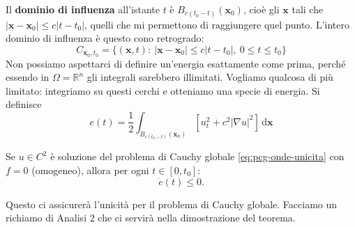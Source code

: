 \documentclass[10pt,a4paper,twoside,openright]{book}
\newcommand{\x}{\mathbf{x}}
\newcommand{\de}{\,\mathrm d}
\newcommand{\dxx}{\de \x}
\begin{document}
Il \textbf{dominio di influenza} all'istante $t$ è $B_{c(t_{0} -t)}(\x_{0})$, cioè gli $\x$ tali che $| \x -\x_{0}| \leqslant c| t-t_{0}| $, quelli che mi permettono di raggiungere quel punto. L'intero dominio di influenza è questo cono retrogrado:
\begin{equation}
    C_{\x_{0} ,t_{0}} =\{(\x ,t) :\ | \x -\x_{0}| \leqslant c| t-t_{0}| ,\ 0\leqslant t\leqslant t_{0}\}
\end{equation}
Non possiamo aspettarci di definire un'energia esattamente come prima, perché essendo in $\Omega =\mathbb{R}^{n}$ gli integrali sarebbero illimitati. Vogliamo qualcosa di più limitato: integriamo su questi cerchi e otteniamo una specie di energia. Si definisce
\begin{equation}
    e(t) =\frac{1}{2}\int _{B_{c(t_{0} -t)}(\x_{0})}\left[ u_{t}^{2} +c^{2}| \nabla u| ^{2}\right] \dxx
    \label{eq:onde-energia-pcg}
\end{equation}
\begin{theorem}
    Se $u\in C^{2}$ è soluzione del problema di Cauchy globale \eqref{eq:pcg-onde-unicita} con $f=0$ (omogeneo), allora per ogni $t\in [ 0,t_{0}]$:
    \begin{equation}
        \dot{e}(t) \leqslant 0.
    \end{equation}
\end{theorem}
Questo ci assicurerà l'unicità per il problema di Cauchy globale.
Facciamo un richiamo di Analisi 2 che ci servirà nella dimostrazione del teorema.
\end{document}
